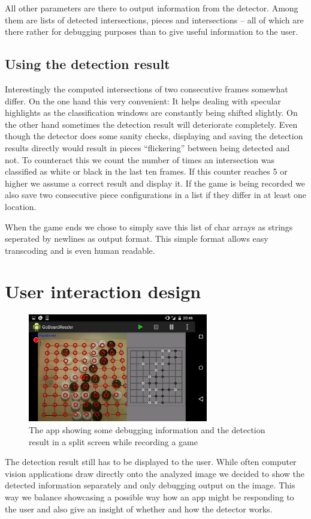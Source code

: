 	All other parameters are there to output information from the detector. Among them are lists of detected intersections, pieces and intersections -- all of which are there rather for debugging purposes than to give useful information to the user.

	\subsection{Using the detection result}
	\label{android-detector-usingResults}
	Interestingly the computed intersections of two consecutive frames somewhat differ. On the one hand this very convenient: It helps dealing with specular highlights as the classification windows are constantly being shifted slightly. On the other hand sometimes the detection result will deteriorate completely. Even though the detector does some sanity checks, displaying and saving the detection results directly would result in pieces ``flickering'' between being detected and not. To counteract this we count the number of times an intersection was classified as white or black in the last ten frames. If this counter reaches 5 or higher we assume a correct result and display it. If the game is being recorded we also save two consecutive piece configurations in a list if they differ in at least one location.

	When the game ends we chose to simply save this list of char arrays as strings seperated by newlines as output format. This simple format allows easy transcoding and is even human readable.

	\section{User interaction design}
	\label{android-ui}
	\begin{figure}[h]
		\center
		\includegraphics[width=0.7\textwidth]{images/android_ui.png}
		\caption{The app showing some debugging information and the detection result in a split screen while recording a game}
		\label{fig:android_ui}
	\end{figure}
	The detection result still has to be displayed to the user. While often computer vision applications draw directly onto the analyzed image we decided to show the detected information separately and only debugging output on the image. This way we balance showcasing a possible way how an app might be responding to the user and also give an insight of whether and how the detector works.

